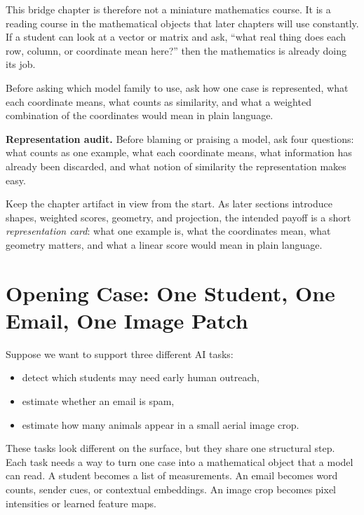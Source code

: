 This bridge chapter is therefore not a miniature mathematics course. It is a reading course in the mathematical objects that later chapters will use constantly. If a student can look at a vector or matrix and ask, ``what real thing does each row, column, or coordinate mean here?'' then the mathematics is already doing its job.

\begin{problemsolvinglens}
Before asking which model family to use, ask how one case is represented, what each coordinate means, what counts as similarity, and what a weighted combination of the coordinates would mean in plain language.
\end{problemsolvinglens}

\begin{thinkingtool}
\textbf{Representation audit.} Before blaming or praising a model, ask four questions: what counts as one example, what each coordinate means, what information has already been discarded, and what notion of similarity the representation makes easy.
\end{thinkingtool}

Keep the chapter artifact in view from the start. As later sections introduce shapes, weighted scores, geometry, and projection, the intended payoff is a short \emph{representation card}: what one example is, what the coordinates mean, what geometry matters, and what a linear score would mean in plain language.

\section*{Opening Case: One Student, One Email, One Image Patch}

Suppose we want to support three different AI tasks:

\begin{itemize}[leftmargin=*]
\item detect which students may need early human outreach,
\item estimate whether an email is spam,
\item estimate how many animals appear in a small aerial image crop.
\end{itemize}

These tasks look different on the surface, but they share one structural step. Each task needs a way to turn one case into a mathematical object that a model can read. A student becomes a list of measurements. An email becomes word counts, sender cues, or contextual embeddings. An image crop becomes pixel intensities or learned feature maps.

